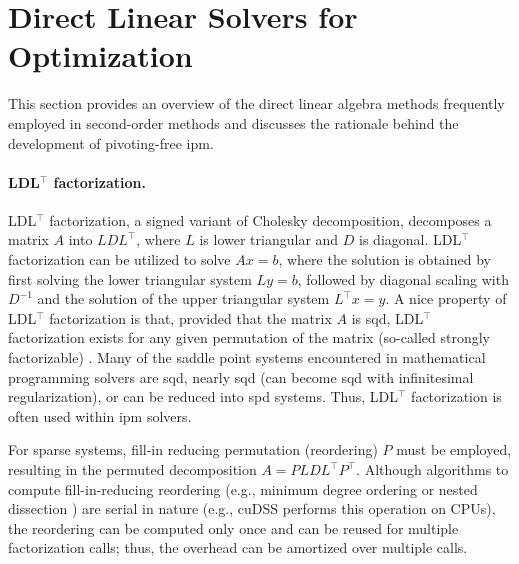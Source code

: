 \documentclass{article}
\begin{document}


\section{Direct Linear Solvers for Optimization}\label{eqn:linear}
This section provides an overview of the direct linear algebra methods frequently employed in second-order methods and discusses the rationale behind the development of pivoting-free \gls*{ipm}.


\paragraph{LDL$^\top$ factorization.}
LDL$^\top$ factorization, a signed variant of Cholesky decomposition, decomposes a matrix $A$ into $LDL^\top$, where $L$ is lower triangular and $D$ is diagonal. LDL$^\top$ factorization can be utilized to solve $Ax = b$, where the solution is obtained by first solving the lower triangular system $Ly = b$, followed by diagonal scaling with $D^{-1}$ and the solution of the upper triangular system $L^\top x = y$. A nice property of LDL$^\top$ factorization is that, provided that the matrix $A$ is \gls*{sqd}, LDL$^\top$ factorization exists for any given permutation of the matrix (so-called strongly factorizable) \cite{vanderbeiSymmetricQuasidefiniteMatrices1995}. Many of the saddle point systems encountered in mathematical programming solvers are \gls*{sqd}, nearly \gls*{sqd} (can become \gls*{sqd} with infinitesimal regularization), or can be reduced into \gls*{spd} systems. Thus, LDL$^\top$ factorization is often used within \gls*{ipm} solvers.

For sparse systems, fill-in reducing permutation (reordering) $P$ must be employed, resulting in the permuted decomposition $A = P L D L^\top P^\top$. Although algorithms to compute fill-in-reducing reordering (e.g., minimum degree ordering \cite{amestoyApproximateMinimumDegree1996} or nested dissection \cite{karypisMETISSoftwarePackage1997}) are serial in nature (e.g., cuDSS performs this operation on CPUs), the reordering can be computed only once and can be reused for multiple factorization calls; thus, the overhead can be amortized over multiple calls.
\end{document}
